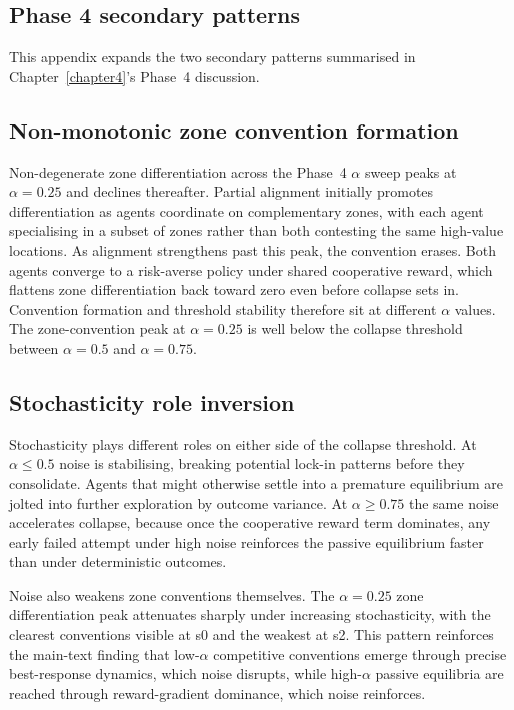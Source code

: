 \begin{appendices}
\chapter{Phase 4 secondary patterns}
\label{appendix:phase4-patterns}

This appendix expands the two secondary patterns summarised in Chapter~\ref{chapter4}'s Phase~4 discussion.

\section{Non-monotonic zone convention formation}

Non-degenerate zone differentiation across the Phase~4 $\alpha$ sweep peaks at $\alpha = 0.25$ and declines thereafter. Partial alignment initially promotes differentiation as agents coordinate on complementary zones, with each agent specialising in a subset of zones rather than both contesting the same high-value locations. As alignment strengthens past this peak, the convention erases. Both agents converge to a risk-averse policy under shared cooperative reward, which flattens zone differentiation back toward zero even before collapse sets in. Convention formation and threshold stability therefore sit at different $\alpha$ values. The zone-convention peak at $\alpha = 0.25$ is well below the collapse threshold between $\alpha = 0.5$ and $\alpha = 0.75$.

\section{Stochasticity role inversion}

Stochasticity plays different roles on either side of the collapse threshold. At $\alpha \le 0.5$ noise is stabilising, breaking potential lock-in patterns before they consolidate. Agents that might otherwise settle into a premature equilibrium are jolted into further exploration by outcome variance. At $\alpha \ge 0.75$ the same noise accelerates collapse, because once the cooperative reward term dominates, any early failed attempt under high noise reinforces the passive equilibrium faster than under deterministic outcomes.

Noise also weakens zone conventions themselves. The $\alpha = 0.25$ zone differentiation peak attenuates sharply under increasing stochasticity, with the clearest conventions visible at s0 and the weakest at s2. This pattern reinforces the main-text finding that low-$\alpha$ competitive conventions emerge through precise best-response dynamics, which noise disrupts, while high-$\alpha$ passive equilibria are reached through reward-gradient dominance, which noise reinforces.


\end{appendices}
